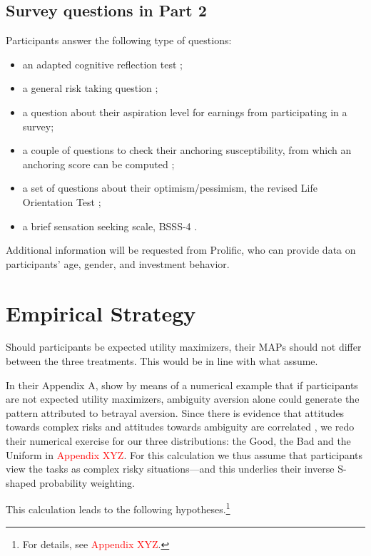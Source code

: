 \subsection{Survey questions in Part 2}
Participants answer the following type of questions:
\begin{itemize}
\item an adapted cognitive reflection test \citep{Frederick2005,Thomson2016};
\item a general risk taking question \citep{Dohmen2011};
\item a question about their aspiration level for earnings from participating in a survey;
\item a couple of questions to check their anchoring susceptibility, from which an anchoring score can be computed \citep{Cheek2017};
\item a set of questions about their optimism/pessimism, the revised Life Orientation Test \citep{Scheier1994};
\item a brief sensation seeking scale, BSSS-4 \citep{Stephenson2003}.
\end{itemize}

Additional information will be requested from Prolific, who can provide data on participants' age, gender, and investment behavior.




\section{Empirical Strategy}
Should participants be expected utility maximizers, their MAPs should not differ between the three treatments.
This would be in line with what \cite{Bohnet2004,Bohnet2008} assume.

In their Appendix A, \cite{Li2020a} show by means of a numerical example that if participants are not expected utility maximizers, ambiguity aversion alone could generate the pattern attributed to betrayal aversion.
Since there is evidence that attitudes towards complex risks and attitudes towards ambiguity are correlated \citep{Armantier2016}, we redo their numerical exercise for our three distributions: the Good, the Bad and the Uniform in \textcolor{red}{Appendix XYZ}.
For this calculation we thus assume that participants view the tasks as complex risky situations---and this underlies their inverse S-shaped probability weighting.

This calculation leads to the following hypotheses.\footnote{
For details, see \textcolor{red}{Appendix XYZ}.
}


